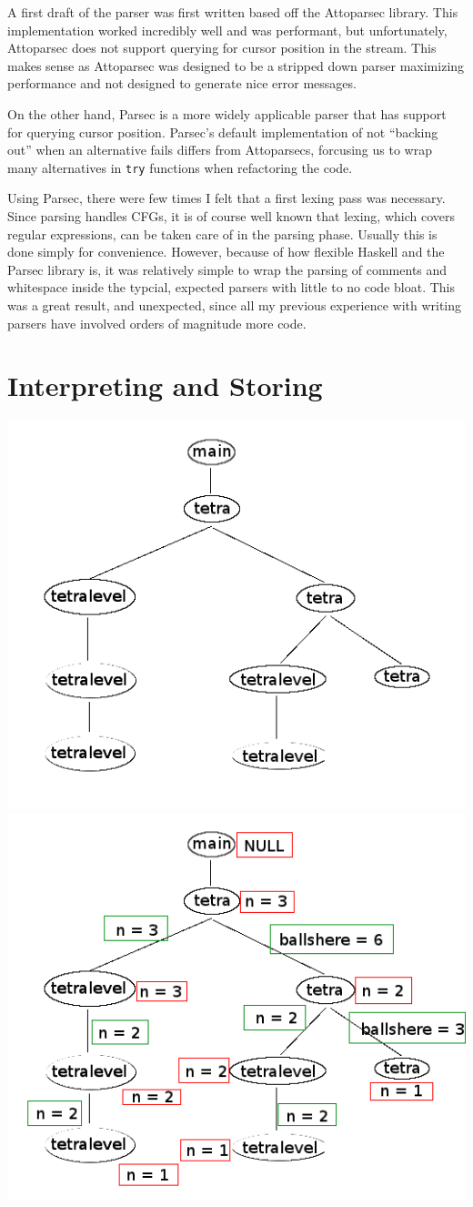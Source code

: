 \documentclass[letterpaper, 10pt]{article}
\newcommand{\ttt}{\texttt}
\begin{document}
A first draft of the parser was first written based off the Attoparsec
library. This implementation worked incredibly well and was performant,
but unfortunately, Attoparsec does not support querying for cursor
position in the stream. This makes sense as Attoparsec was designed to be
a stripped down parser maximizing performance and not designed to generate
nice error messages.

On the other hand, Parsec is a more widely applicable parser that has
support for querying cursor position. Parsec's default implementation of
not ``backing out'' when an alternative fails differs from Attoparsecs,
forcusing us to wrap many alternatives in \ttt{try} functions when
refactoring the code.

Using Parsec, there were few times I felt that a first lexing pass was
necessary. Since parsing handles CFGs, it is of course well
known that lexing, which covers regular expressions, can be taken care of
in the parsing phase. Usually this is done simply for
convenience. However, because of how flexible Haskell and the Parsec
library is, it was relatively simple to wrap the parsing of comments and
whitespace inside the typcial, expected parsers with little to no code
bloat. This was a great result, and unexpected, since all my previous
experience with writing parsers have involved orders of magnitude more
code.

\section{Interpreting and Storing}

\includegraphics[width=0.45\linewidth]{graph.png}
\includegraphics[width=0.45\linewidth]{state.png}
\end{document}
